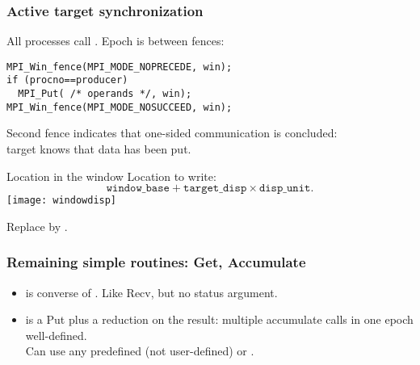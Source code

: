\begin{frame}[containsverbatim]\frametitle{Active target synchronization}
  All processes call . Epoch is between fences:
\lstset{language=C}
\begin{lstlisting}
MPI_Win_fence(MPI_MODE_NOPRECEDE, win);
if (procno==producer)
  MPI_Put( /* operands */, win);
MPI_Win_fence(MPI_MODE_NOSUCCEED, win);
\end{lstlisting}
Second fence indicates that one-sided communication is concluded:\\
target knows that data has been put.
\end{frame}


\begin{frame}{Location in the window}
  Location to write:
  \[ \mathtt{window\_base} + \mathtt{target\_disp}\times \mathtt{disp\_unit}. \]
  \texttt{[image: windowdisp]}
\end{frame}

\begin{exerciseframe}[rightput]
  
\end{exerciseframe}

\begin{exerciseframe}[randomput]
  
\end{exerciseframe}

\begin{optexerciseframe}[randomput]
  Replace  by .
\end{optexerciseframe}

\begin{frame}[containsverbatim]\frametitle{Remaining simple routines:
    Get, Accumulate}
  \begin{itemize}
  \item {} is converse of . Like Recv, but no
    status argument.
  \item {} is a Put plus a reduction on the result:
    multiple accumulate calls in one epoch well-defined.\\
    Can use any predefined  (not user-defined) or .
  \end{itemize}
\end{frame}





